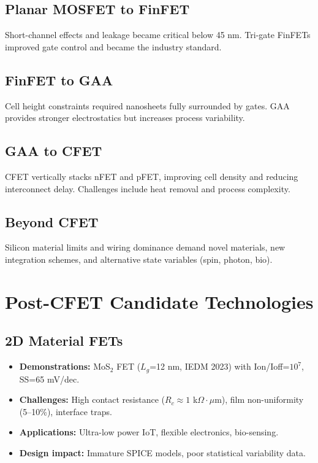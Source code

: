 \documentclass[conference]{IEEEtran}
\begin{document}
\subsection{Planar MOSFET to FinFET}
Short-channel effects and leakage became critical below 45 nm. Tri-gate FinFETs improved gate control and became the industry standard.

\subsection{FinFET to GAA}
Cell height constraints required nanosheets fully surrounded by gates. GAA provides stronger electrostatics but increases process variability.

\subsection{GAA to CFET}
CFET vertically stacks nFET and pFET, improving cell density and reducing interconnect delay. Challenges include heat removal and process complexity.

\subsection{Beyond CFET}
Silicon material limits and wiring dominance demand novel materials, new integration schemes, and alternative state variables (spin, photon, bio).

\section{Post-CFET Candidate Technologies}

\subsection{2D Material FETs}
\begin{itemize}
  \item \textbf{Demonstrations:} MoS$_2$ FET ($L_g$=12 nm, IEDM 2023) with Ion/Ioff=$10^7$, SS=65 mV/dec. 
  \item \textbf{Challenges:} High contact resistance ($R_c \approx 1$ k$\Omega\cdot\mu$m), film non-uniformity (5--10\%), interface traps.  
  \item \textbf{Applications:} Ultra-low power IoT, flexible electronics, bio-sensing.  
  \item \textbf{Design impact:} Immature SPICE models, poor statistical variability data.  
\end{itemize}
\end{document}
